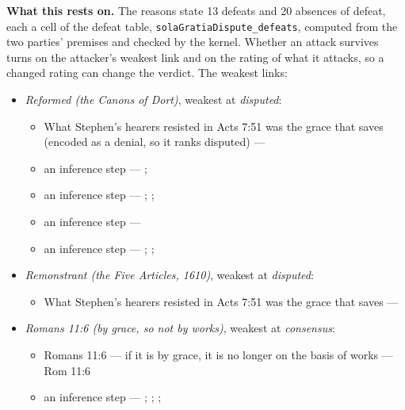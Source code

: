 \documentclass[11pt]{article}
\begin{document}
\par\noindent\textbf{What this rests on.} The reasons state 13 defeats and 20 absences of defeat, each a cell of the defeat table, \texttt{sola\allowbreak{}Gratia\allowbreak{}Dispute\_\allowbreak{}defeats}, computed from the two parties' premises and checked by the kernel. Whether an attack survives turns on the attacker's weakest link and on the rating of what it attacks, so a changed rating can change the verdict. The weakest links:
\begin{itemize}
\item \emph{Reformed (the Canons of Dort)}, weakest at \emph{disputed}:
\begin{itemize}
\item What Stephen’s hearers resisted in Acts 7:51 was the grace that saves (encoded as a denial, so it ranks disputed) --- \cite[Canons of Dort, III/IV, art. 9]{schaff-creeds-christendom-3-1977}
\item an inference step --- \cite[ad loc. Eph 2:8]{robertson-word-pictures-4-1931}; \cite[228--229]{calvin-galatians-ephesians-1854}
\item an inference step --- \cite[600]{arminius-works-1-1825}; \cite[681]{arminius-works-1-1825}; \cite[Five Arminian Articles (1610), art. 4]{schaff-creeds-christendom-3-1977}
\item an inference step --- \cite[527--565]{arminius-works-3-1853}
\item an inference step --- \cite[Solid Declaration II.89]{concordia-triglotta-1921}; \cite[Solid Declaration II.60]{concordia-triglotta-1921}; \cite[Solid Declaration XI.41]{concordia-triglotta-1921}
\end{itemize}
\item \emph{Remonstrant (the Five Articles, 1610)}, weakest at \emph{disputed}:
\begin{itemize}
\item What Stephen’s hearers resisted in Acts 7:51 was the grace that saves --- \cite[Five Arminian Articles (1610), art. 4]{schaff-creeds-christendom-3-1977}
\end{itemize}
\item \emph{Romans 11:6 (by grace, so not by works)}, weakest at \emph{consensus}:
\begin{itemize}
\item Romans 11:6 — if it is by grace, it is no longer on the basis of works --- Rom 11:6
\item an inference step --- \cite[Trent, Session VI (1547), ch. 8]{tanner-decrees-1990}; \cite[36]{waterworth-trent-1848}; \cite[Five Arminian Articles (1610), art. 4]{schaff-creeds-christendom-3-1977}; \cite[Canons of Dort, III/IV, art. 10]{schaff-creeds-christendom-3-1977}

\end{itemize}
\end{itemize}
\end{document}

